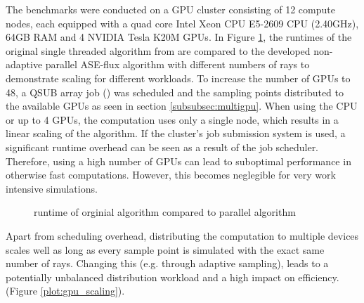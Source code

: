 The benchmarks were conducted on a GPU cluster consisting of 12 compute nodes,
each equipped with a quad core Intel Xeon CPU E5-2609 CPU (2.40GHz), 64GB RAM
and 4 NVIDIA Tesla K20M GPUs. In Figure \ref{plot:runtime}, the runtimes of the
original single threaded algorithm from \cite{ASE2010} are compared to the
developed non-adaptive parallel ASE-flux algorithm with different numbers of
rays to demonstrate scaling for different workloads. To increase the number of
GPUs to 48, a QSUB array job (\cite{qsub}) was scheduled and the sampling points
distributed to the available GPUs as seen in section
\ref{subsubsec:multigpu}. 
When using the CPU or up to 4 GPUs, the computation uses only a single node,
which results in a linear scaling of the algorithm. If the cluster's job
submission system is used, a significant runtime overhead can be seen as a
result of the job scheduler. Therefore, using a high number of GPUs can lead to
suboptimal performance in otherwise fast computations. However, this becomes
neglegible for very work intensive simulations.
\begin{figure}[H]
  \centerline{
    }
  \caption{runtime of orginial algorithm compared to parallel algorithm}
  \label{plot:runtime}
\end{figure}
Apart from scheduling overhead, distributing the computation to multiple devices
scales well as long as every sample point is simulated with the exact same
number of rays. Changing this (e.g. through adaptive sampling), leads to a
potentially unbalanced distribution workload and a high impact on efficiency.
(Figure \ref{plot:gpu_scaling}).
